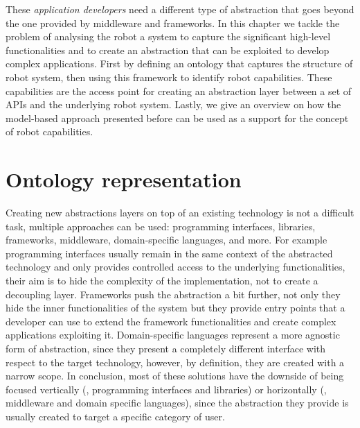 These \textit{application developers} need a different type of abstraction that goes beyond the one provided by middleware and frameworks. In this chapter we tackle the problem of analysing the robot a system to capture the significant high-level functionalities and to create an abstraction that can be exploited to develop complex applications. First by defining an ontology that captures the structure of robot system, then using this framework to identify robot capabilities. These capabilities are the access point for creating an abstraction layer between a set of APIs and the underlying robot system. Lastly, we give an overview on how the model-based approach presented before can be used as a support for the concept of robot capabilities.

\minitoc
\newpage

\section{Ontology representation}
\label{sec:onto}
Creating new abstractions layers on top of an existing technology is not a difficult task, multiple approaches can be used: programming interfaces, libraries, frameworks, middleware, domain-specific languages, and more. For example programming interfaces usually remain in the same context of the abstracted technology and only provides controlled access to the underlying functionalities, their aim is to hide the complexity of the implementation, not to create a decoupling layer. 
Frameworks push the abstraction a bit further, not only they hide the inner functionalities of the system but they provide entry points that a developer can use to extend the framework functionalities and create complex applications exploiting it.
Domain-specific languages represent a more agnostic form of abstraction, since they present a completely different interface with respect to the target  technology, however, by definition, they are created with a narrow scope. In conclusion, most of these solutions have the downside of being focused vertically (\eg, programming interfaces and libraries) or horizontally (\eg, middleware and domain specific languages), since the abstraction they provide is usually created to target a specific category of user.

